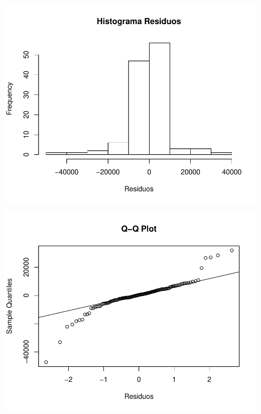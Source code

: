 \documentclass[11pt,a4paper,oneside]{article}\usepackage[]{graphicx}\usepackage[]{color}
\makeatletter
\def\maxwidth{ %
  \ifdim\Gin@nat@width>\linewidth
    \linewidth
  \else
    \Gin@nat@width
  \fi
}
\newenvironment{knitrout}{}{} %
\makeatother
\begin{document}
\begin{knitrout}
{\centering \includegraphics[width=\maxwidth]{figure/unnamed-chunk-16-29} 

}




{\centering \includegraphics[width=\maxwidth]{figure/unnamed-chunk-16-30} 

}





\end{knitrout}
\end{document}
